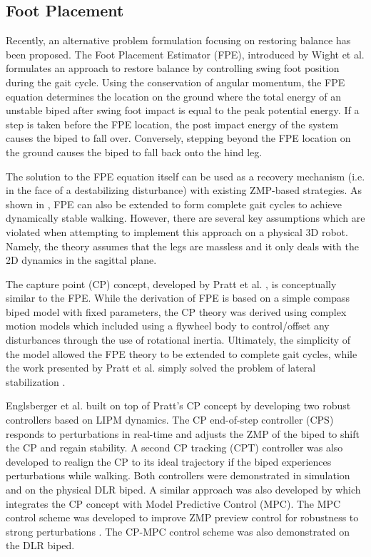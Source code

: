\subsection{Foot Placement} %
\label{sub:related_foot_placement}
Recently, an alternative problem formulation focusing on restoring balance has been proposed. The Foot Placement Estimator (FPE), introduced by Wight et al. \cite{Wight:2008ii} formulates an approach to restore balance by controlling swing foot position during the gait cycle. Using the conservation of angular momentum, the FPE equation determines the location on the ground where the total energy of an unstable biped after swing foot impact is equal to the peak potential energy. If a step is taken before the FPE location, the post impact energy of the system causes the biped to fall over. Conversely, stepping beyond the FPE location on the ground causes the biped to fall back onto the hind leg.

The solution to the FPE equation itself can be used as a recovery mechanism (i.e. in the face of a destabilizing disturbance) with existing ZMP-based strategies. As shown in \cite{Wight:2008ii,Wight:2008vt}, FPE can also be extended to form complete gait cycles to achieve dynamically stable walking. However, there are several key assumptions which are violated when attempting to implement this approach on a physical 3D robot. Namely, the theory assumes that the legs are massless and it only deals with the 2D dynamics in the sagittal plane.

The capture point (CP) concept, developed by Pratt et al. \cite{Pratt:2006vy}, is conceptually similar to the FPE. While the derivation of FPE is based on a simple compass biped model with fixed parameters, the CP theory was derived using complex motion models which included using a flywheel body to control/offset any disturbances through the use of rotational inertia. Ultimately, the simplicity of the model allowed the FPE theory to be extended to complete gait cycles, while the work presented by Pratt et al. simply solved the problem of lateral stabilization \cite{Wight:2008ii}.

Englsberger et al. built on top of Pratt's CP concept \cite{Englsberger:2011jx} by developing two robust controllers based on LIPM dynamics. The CP end-of-step controller (CPS) responds to perturbations in real-time and adjusts the ZMP of the biped to shift the CP and regain stability. A second CP tracking (CPT) controller was also developed to realign the CP to its ideal trajectory if the biped experiences perturbations while walking. Both controllers were demonstrated in simulation and on the physical DLR biped. A similar approach was also developed by \cite{Krause:2012vo} which integrates the CP concept with Model Predictive Control (MPC). The MPC control scheme was developed to improve ZMP preview control for robustness to strong perturbations \cite{Wieber2006}. The CP-MPC control scheme was also demonstrated on the DLR biped.


